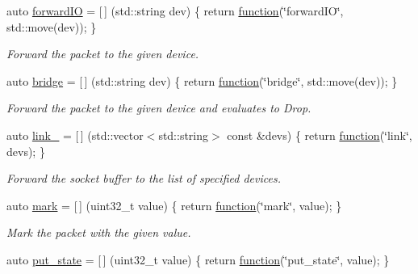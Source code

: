 \begin{DoxyCompactItemize}
auto \hyperlink{namespacepfq_1_1lang_1_1anonymous__namespace_02default_8hpp_03_a3fb6ec42e38c3329534ea3a7024fd967}{forward\+IO} = \mbox{[}$\,$\mbox{]} (std\+::string dev) \{ return \hyperlink{namespacepfq_1_1lang_a1a4638059d700ae08d0ca63886ff2bb3}{function}(\char`\"{}forward\+IO\char`\"{}, std\+::move(dev)); \}
\begin{DoxyCompactList}\small\item\em Forward the packet to the given device. \end{DoxyCompactList}\item 
auto \hyperlink{namespacepfq_1_1lang_1_1anonymous__namespace_02default_8hpp_03_ad318dd8fb6441b78bdfb056173e5a7e2}{bridge} = \mbox{[}$\,$\mbox{]} (std\+::string dev) \{ return \hyperlink{namespacepfq_1_1lang_a1a4638059d700ae08d0ca63886ff2bb3}{function}(\char`\"{}bridge\char`\"{}, std\+::move(dev)); \}
\begin{DoxyCompactList}\small\item\em Forward the packet to the given device and evaluates to {\ttfamily Drop}. \end{DoxyCompactList}\item 
auto \hyperlink{namespacepfq_1_1lang_1_1anonymous__namespace_02default_8hpp_03_aaad98f847b8e4c53a5ddec3c93b05296}{link\+\_\+} = \mbox{[}$\,$\mbox{]} (std\+::vector$<$std\+::string$>$ const \&devs) \{ return \hyperlink{namespacepfq_1_1lang_a1a4638059d700ae08d0ca63886ff2bb3}{function}(\char`\"{}link\char`\"{}, devs); \}
\begin{DoxyCompactList}\small\item\em Forward the socket buffer to the list of specified devices. \end{DoxyCompactList}\item 
auto \hyperlink{namespacepfq_1_1lang_1_1anonymous__namespace_02default_8hpp_03_a7b831baeabda070b89ca862a9445a4a8}{mark} = \mbox{[}$\,$\mbox{]} (uint32\+\_\+t value) \{ return \hyperlink{namespacepfq_1_1lang_a1a4638059d700ae08d0ca63886ff2bb3}{function}(\char`\"{}mark\char`\"{}, value); \}
\begin{DoxyCompactList}\small\item\em Mark the packet with the given value. \end{DoxyCompactList}\item 
auto \hyperlink{namespacepfq_1_1lang_1_1anonymous__namespace_02default_8hpp_03_afd94f51db878b2f70225c944c3f1d300}{put\+\_\+state} = \mbox{[}$\,$\mbox{]} (uint32\+\_\+t value) \{ return \hyperlink{namespacepfq_1_1lang_a1a4638059d700ae08d0ca63886ff2bb3}{function}(\char`\"{}put\+\_\+state\char`\"{}, value); \}

\end{DoxyCompactItemize}
